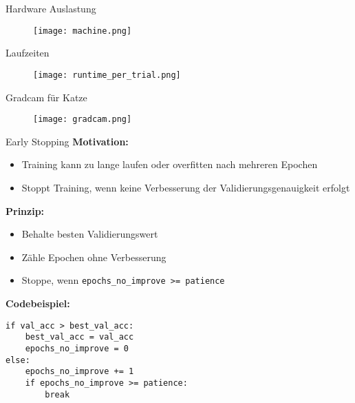 
\begin{frame}{Hardware Auslastung}
    \begin{figure}
        \centering
        \texttt{[image: machine.png]}
    \end{figure}
\end{frame}


\begin{frame}{Laufzeiten}
    \begin{figure}
        \centering
        \texttt{[image: runtime\_per\_trial.png]}
    \end{figure}
\end{frame}


\begin{frame}{Gradcam für Katze}
    \begin{figure}
        \centering
        \texttt{[image: gradcam.png]}
    \end{figure}
\end{frame}



\begin{frame}[fragile]{Early Stopping}
\textbf{Motivation:} 
\begin{itemize}
    \item Training kann zu lange laufen oder overfitten nach mehreren Epochen
    \item Stoppt Training, wenn keine Verbesserung der Validierungsgenauigkeit erfolgt
\end{itemize}

\textbf{Prinzip:}
\begin{itemize}
    \item Behalte besten Validierungswert
    \item Zähle Epochen ohne Verbesserung
    \item Stoppe, wenn \texttt{epochs\_no\_improve >= patience}
\end{itemize}

\textbf{Codebeispiel:}
\begin{verbatim}
if val_acc > best_val_acc:
    best_val_acc = val_acc
    epochs_no_improve = 0
else:
    epochs_no_improve += 1
    if epochs_no_improve >= patience:
        break
\end{verbatim}
\end{frame}

